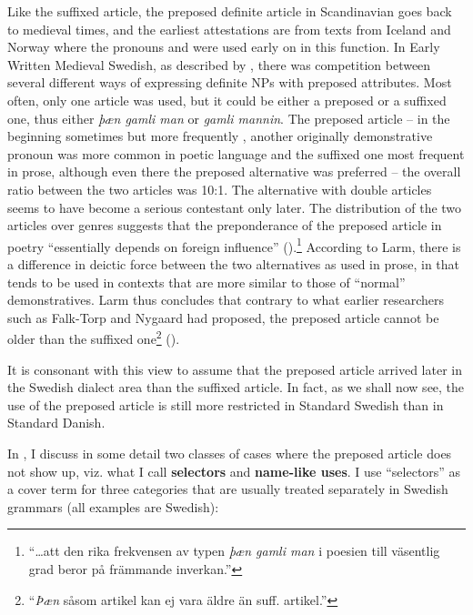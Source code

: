 Like the suffixed article, the preposed definite article in Scandinavian goes back to medieval times, and the earliest attestations are from texts from Iceland and Norway where the pronouns and were used early on in this function. In Early Written Medieval Swedish, as described by \citet{Larm1936}, there was competition between several different ways of expressing definite NPs with preposed attributes. Most often, only one article was used, but it could be either a preposed or a suffixed one, thus either \textit{þæn gamli man} or \textit{gamli mannin}. The preposed article – in the beginning sometimes  but more frequently , another originally demonstrative pronoun was more common in poetic language and the suffixed one most frequent in prose, although even there the preposed alternative was preferred – the overall ratio between the two articles was 10:1. The alternative with double articles seems to have become a serious contestant only later. The distribution of the two articles over genres suggests that the preponderance of the preposed article in poetry “essentially depends on foreign influence” (\citet[68]{Larm1936}).\footnote{ “…att den rika frekvensen av typen \textit{þæn gamli man} i poesien till väsentlig grad beror på främmande inverkan.”} According to Larm, there is a difference in deictic force between the two alternatives as used in prose, in that  tends to be used in contexts that are more similar to those of “normal” demonstratives. Larm thus concludes that contrary to what earlier researchers such as Falk-Torp and Nygaard had proposed, the preposed article  cannot be older than the suffixed one\footnote{ “\textit{Þæn }såsom artikel kan ej vara äldre än suff. artikel.” } (\citet[64]{Larm1936}).

It is consonant with this view to assume that the preposed article arrived later in the Swedish dialect area than the suffixed article. In fact, as we shall now see, the use of the preposed article is still more restricted in Standard Swedish than in Standard Danish. 

In \citet{Dahl2003}, I discuss in some detail two classes of cases where the preposed article does not show up, viz. what I call \textbf{selectors} and \textbf{name-like uses}. I use “selectors” as a cover term for three categories that are usually treated separately in Swedish grammars (all examples are Swedish):

